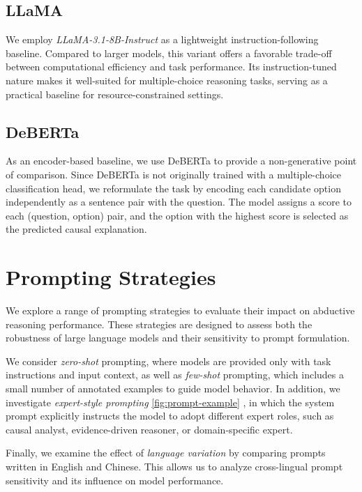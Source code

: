 \documentclass[11pt]{article}
\begin{document}
\subsection{LLaMA}

We employ \textit{LLaMA-3.1-8B-Instruct} as a lightweight instruction-following baseline. Compared to larger models, this variant offers a favorable trade-off between computational efficiency and task performance. Its instruction-tuned nature makes it well-suited for multiple-choice reasoning tasks, serving as a practical baseline for resource-constrained settings.

\subsection{DeBERTa}

As an encoder-based baseline, we use DeBERTa to provide a non-generative point of comparison. Since DeBERTa is not originally trained with a multiple-choice classification head, we reformulate the task by encoding each candidate option independently as a sentence pair with the question. The model assigns a score to each (question, option) pair, and the option with the highest score is selected as the predicted causal explanation.


\section{Prompting Strategies}

We explore a range of prompting strategies to evaluate their impact on abductive reasoning performance. These strategies are designed to assess both the robustness of large language models and their sensitivity to prompt formulation.

We consider \textit{zero-shot} prompting, where models are provided only with task instructions and input context, as well as \textit{few-shot} prompting, which includes a small number of annotated examples to guide model behavior. In addition, we investigate \textit{expert-style prompting} \ref{fig:prompt-example} , in which the system prompt explicitly instructs the model to adopt different expert roles, such as causal analyst, evidence-driven reasoner, or domain-specific expert.

Finally, we examine the effect of \textit{language variation} by comparing prompts written in English and Chinese. This allows us to analyze cross-lingual prompt sensitivity and its influence on model performance.
\end{document}
